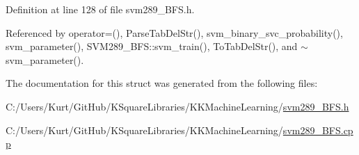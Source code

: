 Definition at line 128 of file svm289\+\_\+\+B\+F\+S.\+h.



Referenced by operator=(), Parse\+Tab\+Del\+Str(), svm\+\_\+binary\+\_\+svc\+\_\+probability(), svm\+\_\+parameter(), S\+V\+M289\+\_\+\+B\+F\+S\+::svm\+\_\+train(), To\+Tab\+Del\+Str(), and $\sim$svm\+\_\+parameter().



The documentation for this struct was generated from the following files\+:\begin{DoxyCompactItemize}
\item 
C\+:/\+Users/\+Kurt/\+Git\+Hub/\+K\+Square\+Libraries/\+K\+K\+Machine\+Learning/\hyperlink{svm289___b_f_s_8h}{svm289\+\_\+\+B\+F\+S.\+h}\item 
C\+:/\+Users/\+Kurt/\+Git\+Hub/\+K\+Square\+Libraries/\+K\+K\+Machine\+Learning/\hyperlink{svm289___b_f_s_8cpp}{svm289\+\_\+\+B\+F\+S.\+cpp}\end{DoxyCompactItemize}
